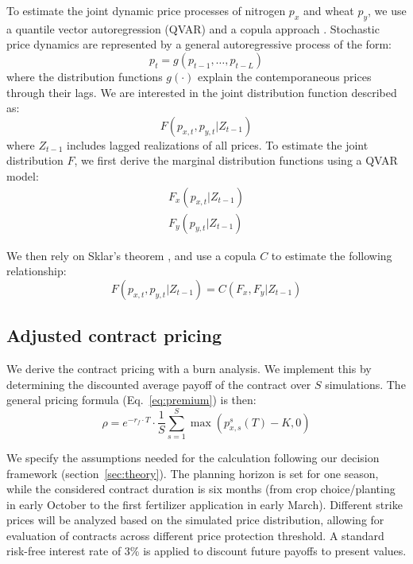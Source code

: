 \documentclass[12pt,a4paper]{article}
\begin{document}
To estimate the joint dynamic price processes of nitrogen $p_x$ and wheat $p_y$, we use a quantile vector autoregression (QVAR) and a copula approach \citep{LiChavas2023}. Stochastic price dynamics are represented by a general autoregressive process of the form:
\begin{equation}
p_t = g(p_{t-1}, \ldots, p_{t-L})
\label{eq:AR}
\end{equation}
where the distribution functions $g(\cdot)$ explain the contemporaneous prices through their lags. We are interested in the joint distribution function described as:
\begin{equation}
F(p_{x,t}, p_{y,t} | Z_{t-1})
\label{eq:joint}
\end{equation}
where $Z_{t-1}$ includes lagged realizations of all prices. To estimate the joint distribution $F$, we first derive the marginal distribution functions using a QVAR model:
\begin{align}
F_{x}(p_{x,t} | Z_{t-1}) \label{eq:margx} \\
F_{y}(p_{y,t} | Z_{t-1}) \label{eq:margy}
\end{align}

We then rely on Sklar's theorem \citep{Sklar1959}, and use a copula $C$ \citep{Nelsen2006} to estimate the following relationship:
\begin{equation}
F(p_{x,t}, p_{y,t} | Z_{t-1}) = C(F_x, F_y | Z_{t-1})
\label{eq:copula}
\end{equation}

\subsection{Adjusted contract pricing}

We derive the contract pricing with a burn analysis. We implement this by determining the discounted average payoff of the contract over $S$ simulations. The general pricing formula (Eq.~\ref{eq:premium}) is then:
\begin{equation}
\rho = e^{-r_f \cdot T} \cdot \frac{1}{S} \sum_{s=1}^{S} \max(p_{x,s}^s(T) - K, 0)
\label{eq:burn}
\end{equation}

We specify the assumptions needed for the calculation following our decision framework (section~\ref{sec:theory}). The planning horizon is set for one season, while the considered contract duration is six months (from crop choice/planting in early October to the first fertilizer application in early March). Different strike prices will be analyzed based on the simulated price distribution, allowing for evaluation of contracts across different price protection threshold. A standard risk-free interest rate of 3\% is applied to discount future payoffs to present values.
\end{document}
